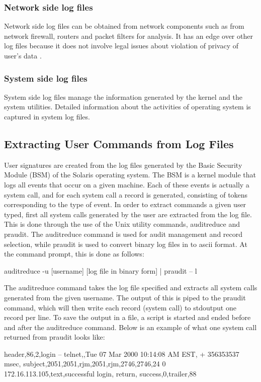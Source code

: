 \documentclass[12pt,a4paper]{report}
\begin{document}
\subsubsection{Network side log files}
Network side log files can be obtained from network components such as from network firewall, routers and packet filters for analysis. It has an edge over other log files because it does not involve legal issues about violation of privacy of user's data .
\subsubsection{System side log files}
System side log files manage the information generated by the kernel and the system utilities. Detailed information about the activities of operating system is captured in system log files. 
\subsection{Extracting User Commands from Log Files }
User signatures are created from the log files generated by the Basic Security
Module (BSM) of the Solaris operating system. The BSM is a kernel module that
logs all events that occur on a given machine. Each of these events is actually a system
call, and for each system call a record is generated, consisting of tokens corresponding to
the type of event. In order to extract commands a given user typed, first all system calls
generated by the user are extracted from the log file. This is done through the use of the
Unix utility commands, auditreduce and praudit. The auditreduce command is used for
audit management and record selection, while praudit is used to convert binary log files
in to ascii format. At the command prompt, this is done as follows:

auditreduce -u [username] [log file in binary form] | praudit – l

The auditreduce command takes the log file specified and extracts all system calls
generated from the given username. The output of this is piped to the praudit command,
which will then write each record (system call) to stdoutput one record per line. To save
the output in a file, a script is started and ended before and after the auditreduce
command.\vspace{1cm} 
Below is an example of what one system call returned from praudit looks like:

header,86,2,login – telnet,,Tue 07 Mar 2000 10:14:08 AM EST, + 356353537 msec,
subject,2051,2051,rjm,2051,rjm,2746,2746,24 0 172.16.113.105,text,successful login, return,
success,0,trailer,88\vspace{1cm}
\end{document}
